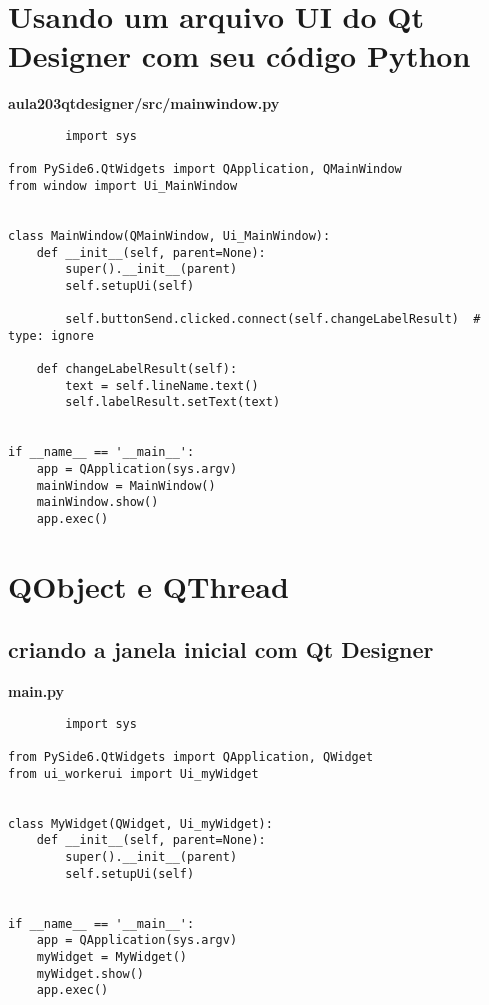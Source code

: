 \documentclass[12pt,a4paper]{article}
\begin{document}
    \section{Usando um arquivo UI do Qt Designer com seu código Python}
    \textbf{aula203qtdesigner/src/mainwindow.py}
    \begin{lstlisting}
        import sys

from PySide6.QtWidgets import QApplication, QMainWindow
from window import Ui_MainWindow


class MainWindow(QMainWindow, Ui_MainWindow):
    def __init__(self, parent=None):
        super().__init__(parent)
        self.setupUi(self)

        self.buttonSend.clicked.connect(self.changeLabelResult)  # type: ignore

    def changeLabelResult(self):
        text = self.lineName.text()
        self.labelResult.setText(text)


if __name__ == '__main__':
    app = QApplication(sys.argv)
    mainWindow = MainWindow()
    mainWindow.show()
    app.exec()
    \end{lstlisting}
    \section{QObject e QThread}
    \subsection{criando a janela inicial com Qt Designer}
    \textbf{main.py}
    \begin{lstlisting}
        import sys

from PySide6.QtWidgets import QApplication, QWidget
from ui_workerui import Ui_myWidget


class MyWidget(QWidget, Ui_myWidget):
    def __init__(self, parent=None):
        super().__init__(parent)
        self.setupUi(self)


if __name__ == '__main__':
    app = QApplication(sys.argv)
    myWidget = MyWidget()
    myWidget.show()
    app.exec()
    \end{lstlisting}
\end{document}
